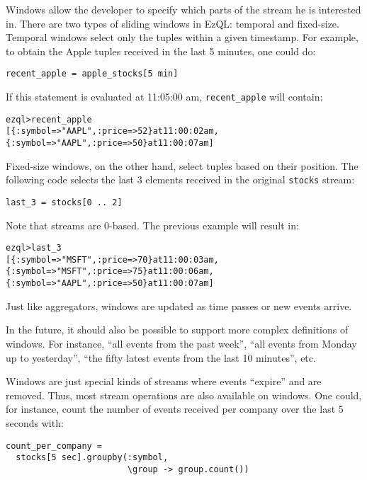 \documentclass{report}
\newenvironment{evaluation}
{
  \framed
  \begin{alltt}
}
{
  \end{alltt}
  \endframed
}
\begin{document}
Windows allow the developer to specify which parts of the stream he is
interested in. There are two types of sliding windows in EzQL:
temporal and fixed-size. Temporal windows select only the tuples
within a given timestamp. For example, to obtain the Apple tuples
received in the last 5 minutes, one could do:

\begin{verbatim}
recent_apple = apple_stocks[5 min]
\end{verbatim}

If this statement is evaluated at 11:05:00 am, \verb=recent_apple=
will contain:

\begin{evaluation}
ezql> recent_apple
[\{ :symbol => "AAPL", :price => 52 \} at 11:00:02 am,
 \{ :symbol => "AAPL", :price => 50 \} at 11:00:07 am]
\end{evaluation}

Fixed-size windows, on the other hand, select tuples based on their
position. The following code selects the last 3 elements received in
the original \verb=stocks= stream:

\begin{verbatim}
last_3 = stocks[0 .. 2]
\end{verbatim}

Note that streams are 0-based. The previous example will result in:

\begin{evaluation}
ezql> last_3
[\{ :symbol => "MSFT", :price => 70 \} at 11:00:03 am,
 \{ :symbol => "MSFT", :price => 75 \} at 11:00:06 am,
 \{ :symbol => "AAPL", :price => 50 \} at 11:00:07 am]
\end{evaluation}

Just like aggregators, windows are updated as time passes or new
events arrive.

In the future, it should also be possible to support more complex
definitions of windows. For instance, ``all events from the past
week'', ``all events from Monday up to yesterday'', ``the fifty latest
events from the last 10 minutes'', etc.

Windows are just special kinds of streams where events ``expire'' and
are removed. Thus, most stream operations are also available on
windows. One could, for instance, count the number of events received
per company over the last 5 seconds with:

\begin{verbatim}
count_per_company =
  stocks[5 sec].groupby(:symbol,
                        \group -> group.count())
\end{verbatim}
\end{document}
